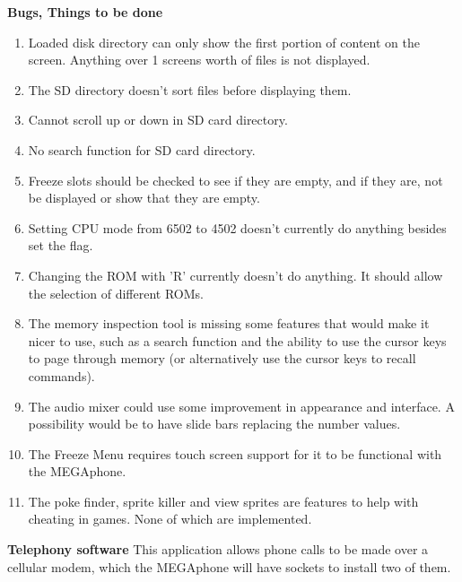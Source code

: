 \textbf{Bugs, Things to be done}
\begin{enumerate}
\item Loaded disk directory can only show the first portion of content on the screen. Anything over 1 screens worth of files is not displayed.
\item The SD directory doesn't sort files before displaying them.
\item Cannot scroll up or down in SD card directory.
\item No search function for SD card directory.
\item Freeze slots should be checked to see if they are empty, and if they are, not be displayed or show that they are empty.
\item Setting CPU mode from 6502 to 4502 doesn't currently do anything besides set the flag.
\item Changing the ROM with 'R' currently doesn't do anything. It should allow the selection of different ROMs.
\item The memory inspection tool is missing some features that would make it nicer to use, such as a search function and the ability to use the cursor keys to page through memory (or alternatively use the cursor keys to recall commands).
\item The audio mixer could use some improvement in appearance and interface. A possibility would be to have slide bars replacing the number values.
\item The Freeze Menu requires touch screen support for it to be functional with the MEGAphone.
\item The poke finder, sprite killer and view sprites are features to help with cheating in games. None of which are implemented.
\end{enumerate}


\textbf{Telephony software}
This application allows phone calls to be made over a cellular modem, which the MEGAphone will have sockets to install two of them. 

